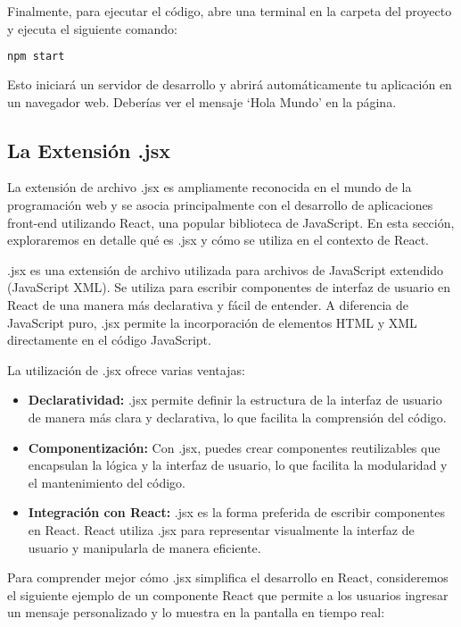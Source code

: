 \documentclass[executivepaper]{article}
\begin{document}
Finalmente, para ejecutar el código, abre una terminal en la carpeta del proyecto y ejecuta el siguiente comando:

\begin{lstlisting}[language=bash]
npm start
\end{lstlisting}

Esto iniciará un servidor de desarrollo y abrirá automáticamente tu aplicación en un navegador web. Deberías ver el mensaje \enquote*{Hola Mundo} en la página.

\subsection{La Extensión .jsx}

La extensión de archivo .jsx es ampliamente reconocida en el mundo de la programación web y se asocia principalmente con el desarrollo de aplicaciones front-end utilizando React, una popular biblioteca de JavaScript. En esta sección, exploraremos en detalle qué es .jsx y cómo se utiliza en el contexto de React.

.jsx es una extensión de archivo utilizada para archivos de JavaScript extendido (JavaScript XML). Se utiliza para escribir componentes de interfaz de usuario en React de una manera más declarativa y fácil de entender. A diferencia de JavaScript puro, .jsx permite la incorporación de elementos HTML y XML directamente en el código JavaScript.

La utilización de .jsx ofrece varias ventajas:

\begin{itemize}
  \item \textbf{Declaratividad:} .jsx permite definir la estructura de la interfaz de usuario de manera más clara y declarativa, lo que facilita la comprensión del código.
  
  \item \textbf{Componentización:} Con .jsx, puedes crear componentes reutilizables que encapsulan la lógica y la interfaz de usuario, lo que facilita la modularidad y el mantenimiento del código.
  
  \item \textbf{Integración con React:} .jsx es la forma preferida de escribir componentes en React. React utiliza .jsx para representar visualmente la interfaz de usuario y manipularla de manera eficiente.
\end{itemize}

Para comprender mejor cómo .jsx simplifica el desarrollo en React, consideremos el siguiente ejemplo de un componente React que permite a los usuarios ingresar un mensaje personalizado y lo muestra en la pantalla en tiempo real:
\end{document}
